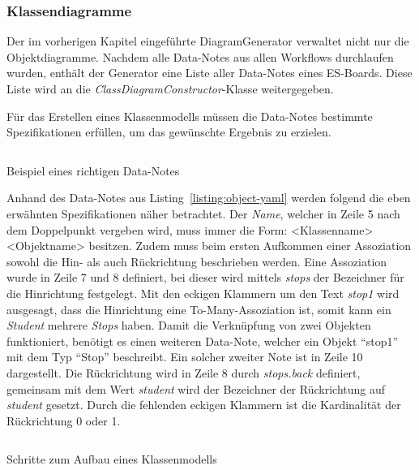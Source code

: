 \subsubsection{Klassendiagramme}
Der im vorherigen Kapitel eingeführte DiagramGenerator verwaltet nicht nur die Objektdiagramme.
Nachdem alle Data-Notes aus allen Workflows durchlaufen wurden, enthält der Generator eine Liste aller Data-Notes eines \ac{ES}-Boards.
Diese Liste wird an die \textit{ClassDiagramConstructor}-Klasse weitergegeben.

Für das Erstellen eines Klassenmodells müssen die Data-Notes bestimmte Spezifikationen erfüllen, um das gewünschte Ergebnis zu erzielen.

\begin{listing}[!ht]
    \inputminted[firstnumber=5]{yaml}{listings/3.1.4/data.es.yaml}
    \caption{Beispiel eines richtigen Data-Notes}
    \label{listing:object-yaml}
\end{listing}

Anhand des Data-Notes aus Listing~\ref{listing:object-yaml} werden folgend die eben erwähnten Spezifikationen näher betrachtet.
Der \textit{Name}, welcher in Zeile 5 nach dem Doppelpunkt vergeben wird, muss immer die Form: <Klassenname> <Objektname> besitzen.
Zudem muss beim ersten Aufkommen einer Assoziation sowohl die Hin- als auch Rückrichtung beschrieben werden.
Eine Assoziation wurde in Zeile 7 und 8 definiert, bei dieser wird mittels \textit{stops} der Bezeichner für die Hinrichtung festgelegt.
Mit den eckigen Klammern um den Text \textit{stop1} wird ausgesagt, dass die Hinrichtung eine To-Many-Assoziation ist, somit kann ein \textit{Student} mehrere \textit{Stops} haben.
Damit die Verknüpfung von zwei Objekten funktioniert, benötigt es einen weiteren Data-Note, welcher ein Objekt ``stop1'' mit dem Typ ``Stop'' beschreibt.
Ein solcher zweiter Note ist in Zeile 10 dargestellt.
Die Rückrichtung wird in Zeile 8 durch \textit{stops.back} definiert, gemeinsam mit dem Wert \textit{student} wird der Bezeichner
der Rückrichtung auf \textit{student} gesetzt.
Durch die fehlenden eckigen Klammern ist die Kardinalität der Rückrichtung 0 oder 1.

\begin{listing}[!ht]
    \inputminted[firstnumber=39]{java}{listings/3.1.4/ClassProcedure.java}
    \caption{Schritte zum Aufbau eines Klassenmodells}
    \label{listing:class-procedure}
\end{listing}


